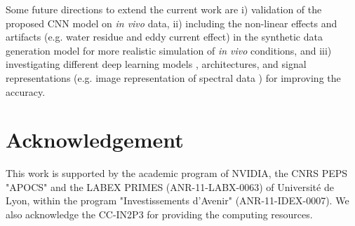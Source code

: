 \documentclass{llncs}
\begin{document}
Some future directions to extend the current work are i) validation of the proposed CNN model on\textit{ in vivo} data, ii) including the non-linear effects and artifacts (e.g. water residue and eddy current effect) in the synthetic data generation model for more realistic simulation of\textit{ in vivo} conditions, and iii) investigating different deep learning models%
, architectures, and signal representations (e.g. image representation of spectral data \cite{hatami2017}) for improving the accuracy.

\section*{Acknowledgement}

This work is supported by the academic program of NVIDIA, the CNRS PEPS "APOCS" and the LABEX PRIMES (ANR-11-LABX-0063) of Universit\'e de Lyon, within the program "Investissements d'Avenir" (ANR-11-IDEX-0007).
We also acknowledge the CC-IN2P3 for providing the computing resources.
\end{document}
